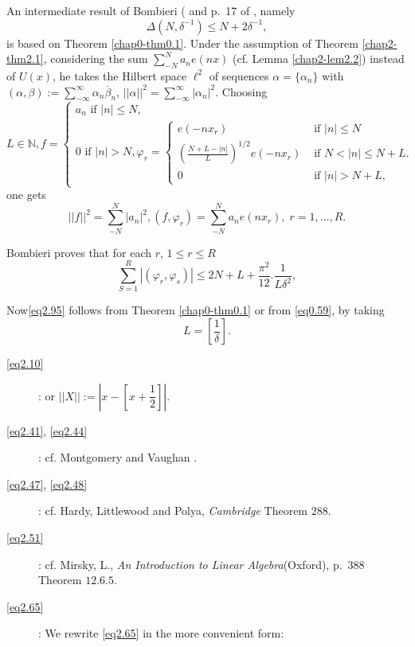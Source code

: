 An intermediate result of Bombieri (\cite{key4} and p.~17  of
\cite{key6}, namely 
\begin{equation*}
\Delta (N, \delta^{-1})\leq N+ 2 \delta^{-1},  \tag{2.95}\label{eq2.95}
\end{equation*}
is based on Theorem \ref{chap0-thm0.1}. Under the assumption of
Theorem \ref{chap2-thm2.1}, considering the sum
$\sum_{-N}^{N}a_ne(nx)$ (cf. Lemma \ref{chap2-lem2.2}) instead of
$U(x)$, he takes the Hilbert space $\ell^2$ of sequences $\alpha =
\{\alpha _n \}$ with $(\alpha, \beta):=
\sum_{-\infty}^{\infty}\alpha_n \overline{\beta}_n$, $||\alpha ||^2
=\sum_{-\infty}^{\infty}|\alpha_n|^2$. Choosing
{\fontsize{10}{12}\selectfont
\begin{equation*}
L\in \mathbb{N},f=
\begin{cases}
a_n \text{ if }|n|\leq N,\\
0 \text{ if } |n|>N,
\varphi_r =
\begin{cases}
e(-nx_r) &\text{ if } |n| \leq N\\
(\frac{N+L-|n|}{L})^{1/2}e(-nx_r) &\text{ if } N< |n| \leq N+L.\\
0 &\text{ if } |n|>N+L,
\end{cases}
\end{cases}  \tag{2.96}\label{eq2.96}
\end{equation*}}
one gets
\begin{equation*}
||f||^2 =\sum_{-N}^{N}|a_n|^2, (f,\varphi_r )= \sum_{-N}^{N} a_n e(n
x_r), \; r = 1,\ldots ,R.  \tag{2.97}\label{eq2.97} 
\end{equation*}

Bombieri proves that for each $r$, $1 \leq r \leq R$
\begin{equation*}
\sum_{S=1}^{R}|(\varphi_r, \varphi_s )|\leq 2N + L +
\frac{\pi^2}{12}.\frac{1}{L \delta^2},  \tag{2.98}\label{eq2.98} 
\end{equation*}

Now\pageoriginale \eqref{eq2.95} follows from Theorem
\ref{chap0-thm0.1} or from \eqref{eq0.59}, by taking 
\begin{equation*}
L=\left[\frac{1}{\delta} \right]. \tag{2.99}\label{eq2.99}
\end{equation*}
\begin{description}
\item[\eqref{eq2.10}]: or $||X||:=|x-[x+\dfrac{1}{2}]|$.

\item[\eqref{eq2.41}, \eqref{eq2.44}]: cf. Montgomery and Vaughan
  \cite{key2}. 

\item[\eqref{eq2.47}, \eqref{eq2.48}]: cf. Hardy, Littlewood and
  Polya, \textit{Cambridge}  Theorem $288$.

\item[\eqref{eq2.51}]: cf. Mirsky, L., \textit{An Introduction to
  Linear Algebra}(Oxford), p.~388 Theorem \underline{$12.6.5$}. 

\item[\eqref{eq2.65}]: We rewrite \eqref{eq2.65} in the more convenient form:
\end{description}

